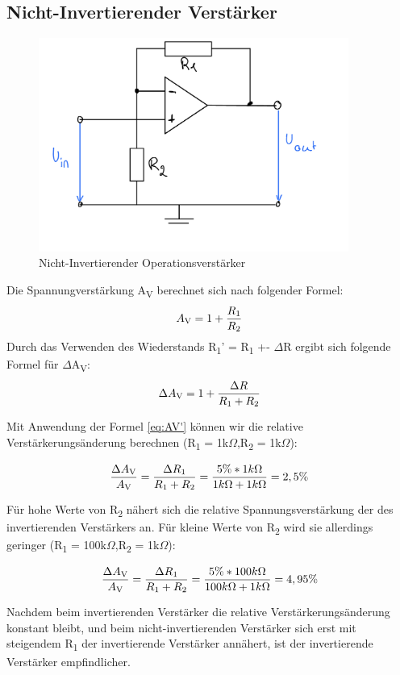 \subsection{Nicht-Invertierender Verstärker}
\begin{figure}[H]
	\centering
	\includegraphics[height=7cm]{images/Versuch5/nicht-invertierend-opamp.jpeg} 
	\caption{Nicht-Invertierender Operationsverstärker}
	\label{fig: Nicht-Invertierender Operationsverstärker}
\end{figure}
Die Spannungverstärkung A\textsubscript{V} berechnet sich nach folgender Formel:
\begin{equation}
	A\textsubscript{V} = 1 + \frac{R\textsubscript{1}}{R\textsubscript{2}}
	\label{eq:AV}
\end{equation}
Durch das Verwenden des Wiederstands R\textsubscript{1}' = R\textsubscript{1} +- $\Delta$R 
ergibt sich folgende Formel für $\Delta$A\textsubscript{V}:
\begin{equation}
	\Delta A\textsubscript{V} = 1 + \frac{\Delta R}{R\textsubscript{1}+ R\textsubscript{2}}
	\label{eq:AV'}
\end{equation}

Mit Anwendung der Formel \ref*{eq:AV'} können wir die relative Verstärkerungsänderung
berechnen (R\textsubscript{1} = 1k$\Omega$,R\textsubscript{2} = 1k$\Omega$):

\begin{equation}
	\frac{\Delta A\textsubscript{V}}{A\textsubscript{V}}
	= \frac{\Delta R\textsubscript{1}}{R\textsubscript{1} + R\textsubscript{2}}
	= \frac{5\% * 1k\Omega}{1k\Omega + 1k\Omega} 
	= 2,5\%
\end{equation}

Für hohe Werte von R\textsubscript{2} nähert sich die relative Spannungsverstärkung
der des invertierenden Verstärkers an. Für kleine Werte von R\textsubscript{2} wird
sie allerdings geringer (R\textsubscript{1} = 100k$\Omega$,R\textsubscript{2} = 1k$\Omega$):

\begin{equation}
	\frac{\Delta A\textsubscript{V}}{A\textsubscript{V}}
	= \frac{\Delta R\textsubscript{1}}{R\textsubscript{1} + R\textsubscript{2}}
	= \frac{5\% * 100k\Omega}{100k\Omega + 1k\Omega} 
	= 4,95\%
\end{equation}

Nachdem beim invertierenden Verstärker die relative Verstärkerungsänderung konstant bleibt,
und beim nicht-invertierenden Verstärker sich erst mit steigendem R\textsubscript{1} der
invertierende Verstärker annähert, ist der invertierende Verstärker empfindlicher. 